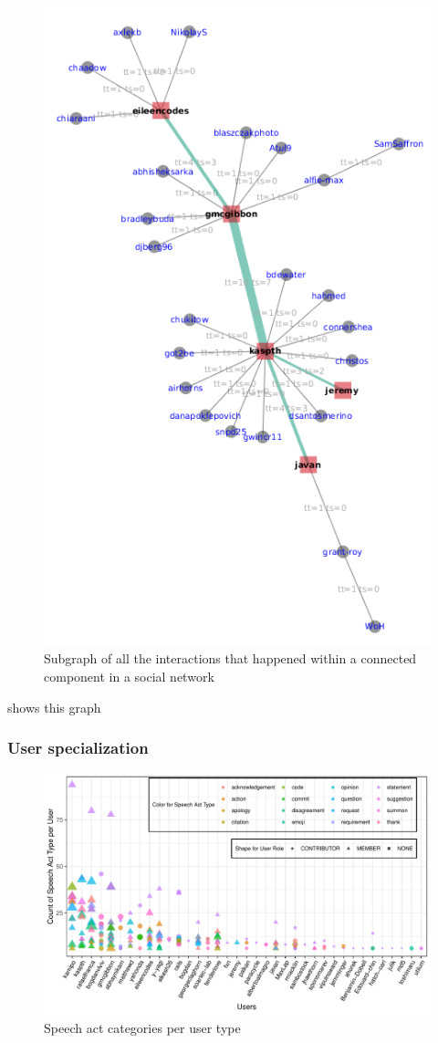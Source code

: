 \begin{figure}[h]
	\centering
	\includegraphics[width=0.7\linewidth]{figures/socio-graph}
	\caption[Subgraph of all the interactions in a group]{Subgraph of all the interactions that happened within a connected component in a social network}
	\label{fig:socio-graph}
\end{figure}

 shows this graph 

\subsubsection{User specialization}

\begin{figure}[h]
	\centering
	\includegraphics[width=\linewidth]{figures/speechActTypesPerUser}
	\caption{Speech act categories per user type}
	\label{fig:speech-act-types-per-user}
\end{figure}

